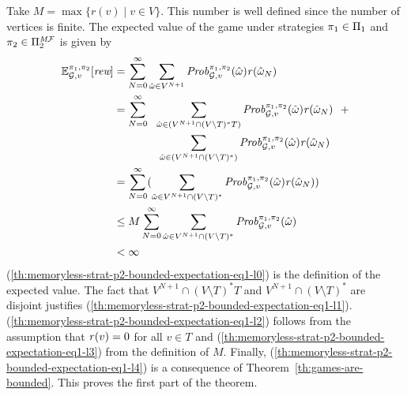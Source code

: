 \begin{myproof}
  Take $M = \max \{r(v) \mid v \in V\}$.  This number is well defined
  since the number of vertices is finite.
  The expected value of the game under strategies
  $\pi_{1} \in \Pi_{1}$ and $\pi_{2} \in \Pi^{\textit{M}\mathcal{F}}_{2}$
  is given by
  \begin{align}	
    \label{th:memoryless-strat-p2-bounded-expectation-eq1-l0}
    \mathbb{E}^{\pi_{1}, \pi_{2}}_{\mathcal{G},v}[\textit{rew}]
    & = \sum^{\infty}_{N=0} \sum_{\hat{\omega} \in V^{N+1}} \mathit{Prob}^{\pi_{1}, \pi_{2}}_{\mathcal{G},v}(\hat{\omega})\mathit{r}(\hat{\omega}_N) \\
    \label{th:memoryless-strat-p2-bounded-expectation-eq1-l1}	
    & = \sum^{\infty}_{N=0} \ \ \sum_{\hat{\omega} \in (V^{N+1} \cap (V \setminus T)^*T)} \mathit{Prob}^{\pi_{1}, \pi_{2}}_{\mathcal{G},v}(\hat{\omega})  \mathit{r}(\hat{\omega}_N) \ \ + \notag\\
    &\hspace*{4em} \sum_{\hat{\omega} \in (V^{N+1} \cap (V \setminus T)^*)} \mathit{Prob}^{\pi_{1}, \pi_{2}}_{\mathcal{G},v}(\hat{\omega}) \mathit{r}(\hat{\omega}_N)   \\
    \label{th:memoryless-strat-p2-bounded-expectation-eq1-l2}
    & =  \sum^{\infty}_{N=0}  (\sum_{\hat{\omega} \in V^{N+1} \cap (V \setminus T)^*} \mathit{Prob}^{\pi_{1}, \pi_{2}}_{\mathcal{G},v}(\hat{\omega}) \mathit{r}(\hat{\omega}_N) ) \\
    \label{th:memoryless-strat-p2-bounded-expectation-eq1-l3}
    & \leq M \sum^{\infty}_{N=0}  \sum_{\hat{\omega} \in V^{N+1} \cap (V \setminus T)^*} \mathit{Prob}^{\pi_{1}, \pi_{2}}_{\mathcal{G},v}(\hat{\omega})  \\
    \label{th:memoryless-strat-p2-bounded-expectation-eq1-l4}
    & < \infty 
  \end{align}
  (\ref{th:memoryless-strat-p2-bounded-expectation-eq1-l0}) is the
  definition of the expected value.
  The fact that $V^{N+1} \cap (V \setminus T)^*T$ and
  $V^{N+1} \cap (V \setminus T)^*$ are disjoint justifies
  (\ref{th:memoryless-strat-p2-bounded-expectation-eq1-l1}).
  (\ref{th:memoryless-strat-p2-bounded-expectation-eq1-l2}) follows
  from the assumption that $\mathit{r}(v) = 0$ for all $v \in T$ and
  (\ref{th:memoryless-strat-p2-bounded-expectation-eq1-l3}) from the
  definition of $M$.
  Finally, (\ref{th:memoryless-strat-p2-bounded-expectation-eq1-l4})
  is a consequence of Theorem~\ref{th:games-are-bounded}.
  This proves the first part of the theorem.


\end{myproof}
